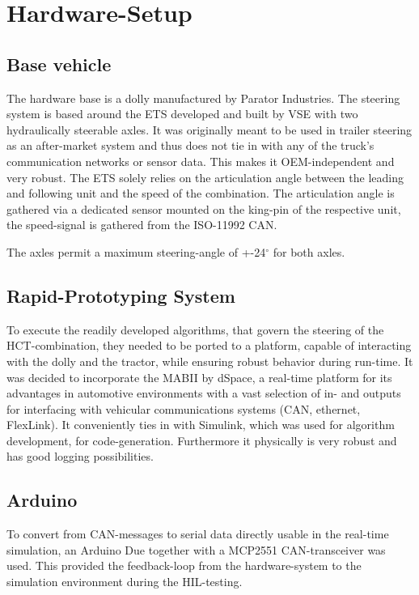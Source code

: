 \documentclass[root.tex]{subfiles}
\begin{document}
{\pagestyle{empty}}
\section{Hardware-Setup}
\label{chap:Hardware-Setup}
\subsection{Base vehicle}
\label{sec:basevehicle}

The hardware base is a dolly manufactured by Parator Industries. The steering system is based around the \gls{ETS} developed and built by \gls{VSE} with two hydraulically steerable axles. It was originally meant to be used in trailer steering as an after-market system and thus does not tie in with any of the truck's communication networks or sensor data. This makes it OEM-independent and very robust. The \gls{ETS} solely relies on the articulation angle between the leading and following unit and the speed of the combination. The articulation angle is gathered via a dedicated sensor mounted on the king-pin of the respective unit, the speed-signal is gathered from the ISO-11992 \gls{CAN}. 

The axles permit a maximum steering-angle of +-24$^\circ$ for both axles. 
\subsection{Rapid-Prototyping System}

To execute the readily developed algorithms, that govern the steering of the \gls{HCT}-combination, they needed to be ported to a platform, capable of interacting with the dolly and the tractor, while ensuring robust behavior during run-time. It was decided to incorporate the \gls{MABII} by dSpace, a real-time platform for its advantages in automotive environments with a vast selection of in- and outputs for interfacing with vehicular communications systems (\gls{CAN}, ethernet, FlexLink). It conveniently ties in with Simulink, which was used for algorithm development, for code-generation. Furthermore it physically is very robust and has good logging possibilities.


\subsection{Arduino}

To convert from \gls{CAN}-messages to serial data directly usable in the real-time simulation, an Arduino Due together with a MCP2551 \gls{CAN}-transceiver was used. This provided the feedback-loop from the hardware-system to the simulation environment during the \gls{HIL}-testing. 
\end{document}
